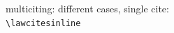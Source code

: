 \noindent
\theball
multiciting: different cases, single cite: \\
\verb|\lawcitesinline|
\bigskip


\renewcommand\democodeprefix{{\small syntax:} }
\renewcommand{\demoresultprefix}{\noindent {\small output:}}


\begin{filecontents}{\democodefile}
\end{filecontents}
\PrintCodeAndResultsStackedR
%

\spotsep


